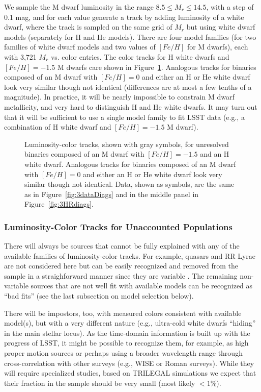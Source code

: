 We sample the M dwarf luminosity in the range $8.5 \le M_r \le 14.5$, with a step of 0.1 mag, and for each value
generate a track by adding luminosity of a white dwarf, where the track is sampled on the same grid of $M_r$ but
using white dwarf models (separately for H and He models). There are four model families (for two families of white dwarf
models and two values of $[Fe/H]$ for M dwarfs), each with 3,721 $M_r$ vs. color entries. The color tracks for H white dwarfs
and $[Fe/H]=-1.5$ M dwarfs care shown in Figure~\ref{fig:locusBinaries}. Analogous tracks for binaries composed of an M dwarf with
$[Fe/H]=0$ and either an H or He white dwarf look very similar though not identical (differences are at most a few tenths
of a magnitude). In practice, it will be nearly impossible to constrain M dwarf metallicity, and very hard to distinguish
H and He white dwarfs. It may turn out that it will be sufficient to use a single model family to fit LSST data (e.g., a
combination of H white dwarf and $[Fe/H]=-1.5$ M dwarf). 



\begin{figure}[ht!]
\caption{Luminosity-color tracks, shown with gray symbols, for unresolved binaries composed of an M dwarf with
  $[Fe/H]=-1.5$ and an H white dwarf. Analogous tracks for binaries composed of an M dwarf with
  $[Fe/H]=0$ and either an H or He white dwarf look very similar though not identical. Data, shown as symbols,
  are the same as in Figure~\ref{fig:3dataDiags} and in the middle panel in Figure~\ref{fig:3HRdiags}.} 
\label{fig:locusBinaries}
\end{figure}

 


\subsubsection{Luminosity-Color Tracks for Unaccounted Populations}

There will always be sources that cannot be fully explained with any of the available families of
luminosity-color tracks. For example, quasars and RR Lyrae are not considered here
but can be easily recognized and removed from the sample in a straighforward manner since
they are variable \citep[e.g., see][]{2007AJ....134.2236S}. The remaining non-variable sources
that are not well fit with available models can be recognized as ``bad fits'' (see the last subsection on
model selection below). 

There will be impostors, too, with measured colors consistent with available model(s), but
with a very different nature (e.g., ultra-cold white dwarfs ``hiding'' in the main stellar locus).
As the time-domain information is built up with the progress of LSST, 
it might be possible to recognize them, for example, as high proper motion sources or perhaps
using a broader wavelength range through cross-correlation with other surveys (e.g., WISE or
Roman surveys). While they will require specialized studies, based on TRILEGAL simulations
we expect that their fraction in the sample should be very small (most likely $<1$\%). 


